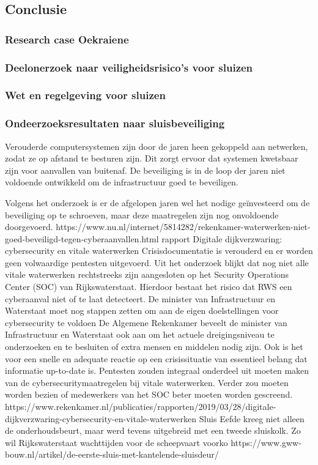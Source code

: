 \subsection{Conclusie}


\newpage
{}



\subsubsection{Research case Oekraiene}
\subsubsection{Deelonerzoek naar veiligheidsrisico's voor sluizen}
\subsubsection{Wet en regelgeving voor sluizen}


\subsubsection{Ondeerzoeksresultaten naar sluisbeveiliging}



Verouderde computersystemen zijn door de jaren heen gekoppeld aan netwerken, zodat ze op afstand te besturen zijn. Dit zorgt ervoor dat systemen kwetsbaar zijn voor aanvallen van buitenaf. De beveiliging is in de loop der jaren niet voldoende ontwikkeld om de infrastructuur goed te beveiligen.

Volgens het onderzoek is er de afgelopen jaren wel het nodige geïnvesteerd om de beveiliging op te schroeven, maar deze maatregelen zijn nog onvoldoende doorgevoerd.
https://www.nu.nl/internet/5814282/rekenkamer-waterwerken-niet-goed-beveiligd-tegen-cyberaanvallen.html
rapport Digitale dijkverzwaring: cybersecurity en vitale waterwerken 
Crisisdocumentatie is verouderd en er worden geen volwaardige pentesten uitgevoerd. Uit het onderzoek blijkt dat nog niet alle vitale waterwerken rechtstreeks zijn aangesloten op het Security Operations Center (SOC) van Rijkswaterstaat. Hierdoor bestaat het risico dat RWS een cyberaanval niet of te laat detecteert. De minister van Infrastructuur en Waterstaat moet nog stappen zetten om aan de eigen doelstellingen voor cybersecurity te voldoen
De Algemene Rekenkamer beveelt de minister van Infrastructuur en Waterstaat ook aan om het actuele dreigingsniveau te onderzoeken en te besluiten of extra mensen en middelen nodig zijn. Ook is het voor een snelle en adequate reactie op een crisissituatie van essentieel belang dat informatie up-to-date is. Pentesten zouden integraal onderdeel uit moeten maken van de cybersecuritymaatregelen bij vitale waterwerken. Verder zou moeten worden bezien of medewerkers van het SOC beter moeten worden gescreend.
https://www.rekenkamer.nl/publicaties/rapporten/2019/03/28/digitale-dijkverzwaring-cybersecurity-en-vitale-waterwerken
Sluis Eefde kreeg niet alleen de onderhoudsbeurt, maar werd tevens uitgebreid met een tweede sluiskolk. Zo wil Rijkswaterstaat wachttijden voor de scheepvaart voorko
https://www.gww-bouw.nl/artikel/de-eerste-sluis-met-kantelende-sluisdeur/

